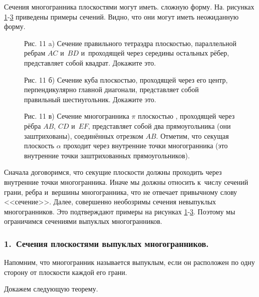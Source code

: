 
Сечения многогранника плоскостями могут иметь. сложную форму. На. рисунках
\ref{fig:8_2_11_a}-\ref{fig:8_2_11_c} приведены примеры сечений.
Видно, что они могут иметь неожиданную форму.

\begin{figure}\label{fig:8_2_11_a}
\caption{Рис. 11 a) Сечение правильного тетраэдра плоскостью, параллельной ребрам
$AC$ и~$BD$ и~проходящей через середины остальных рёбер, представляет собой
квадрат. Докажите это.}
\end{figure}


\begin{figure}\label{fig:8_2_11_b}
\caption{Рис. 11 б) Сечение куба плоскостью, проходящей через его центр,
перпендикулярно главной диагонали, представляет собой правильный шестиугольник.
Докажите это.}
\end{figure}

\begin{figure}\label{fig:8_2_11_c}
\caption{Рис. 11 в) Сечение многогранника $\pi$ плоскостью , проходящей через рёбра
$AB$, $CD$ и~$EF$‚ представляет собой два прямоугольника (они заштрихованы),
соединённых отрезком $AB$. Отметим, что секущая плоскость $\alpha$ проходит
через внутренние точки многогранника (это внутренние точки заштрихованных
прямоугольников).}
\end{figure}


Сначала договоримся, что секущие плоскости должны проходить через внутренние
точки многогранника. Иначе мы должны относить к~числу сечений грани, ребра
и~вершины многогранника, что не отвечает привычному слову <<сечение>>.
Далее, совершенно необозримы сечения невыпуклых многогранников.
Это подтверждают примеры на рисунках
\ref{fig:8_2_11_a}-\ref{fig:8_2_11_c}.
Поэтому мы ограничимся сечениями выпуклых многогранников.


\subsubsection{1.~Сечения плоскостями выпуклых многогранников.}

Напомним, что многогранник называется выпуклым, если он расположен по одну
сторону от плоскости каждой его грани.

Докажем следующую теорему.


